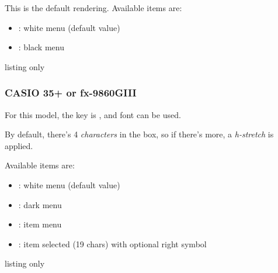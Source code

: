 \documentclass[11pt,a4paper]{ltxdoc}
\begin{document}
This is the default rendering. Available items are:

\begin{itemize}[leftmargin=*]
	\item \ShowCode{[type=\{\}]}: white menu (default value)\hfill{}
	\item \ShowCode{[type=black]}: black menu\hfill{}
\end{itemize}

\begin{DemoCode}{listing only}
\end{DemoCode}

\subsubsection{CASIO 35+ or fx-9860GIII}

For this model, the key is \ShowCode{[model=35+]}, and font \ShowCode{[font=\\fontCASIOA]} can be used.

By default, there's 4 \textit{characters} in the box, so if there's more, a \textit{h-stretch} is applied.

Available items are:

\begin{itemize}[leftmargin=*]
	\item \ShowCode{[type=\{\}]}: white menu (default value) \hfill{}
	\item \ShowCode{[type=bmenu]}: dark menu \hfill{}
	\item \ShowCode{[type=item]}: item menu \hfill{}
	\item \ShowCode{[type=itemsel]}: item selected (19 chars) with optional right symbol\hfill{}
\end{itemize}

\begin{DemoCode}{listing only}
\end{DemoCode}
\end{document}

